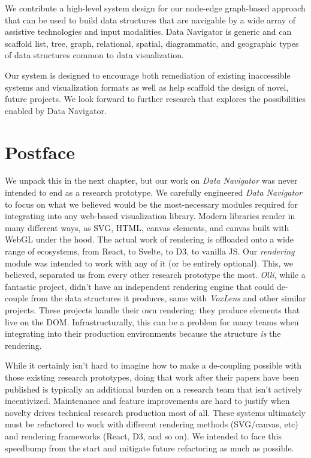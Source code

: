 \documentclass[12pt]{cmuthesis}
\begin{document}
We contribute a high-level system design for our node-edge graph-based approach that can be used to build data structures that are navigable by a wide array of assistive technologies and input modalities. Data Navigator is generic and can scaffold list, tree, graph, relational, spatial, diagrammatic, and geographic types of data structures common to data visualization.

Our system is designed to encourage both remediation of existing inaccessible systems and visualization formats as well as help scaffold the design of novel, future projects. We look forward to further research that explores the possibilities enabled by Data Navigator.

\newpage

\section{Postface}

We unpack this in the next chapter, but our work on \textit{Data Navigator} was never intended to end as a research prototype. We carefully engineered \textit{Data Navigator} to focus on what we believed would be the most-necessary modules required for integrating into any web-based visualization library. Modern libraries render in many different ways, as SVG, HTML, canvas elements, and canvas built with WebGL under the hood. The actual work of rendering is offloaded onto a wide range of ecosystems, from React, to Svelte, to D3, to vanilla JS. Our \textit{rendering} module was intended to work with any of it (or be entirely optional). This, we believed, separated us from every other research prototype the most. \textit{Olli}, while a fantastic project, didn't have an independent rendering engine that could de-couple from the data structures it produces, same with \textit{VoxLens} and other similar projects. These projects handle their own rendering: they produce elements that live on the DOM. Infrastructurally, this can be a problem for many teams when integrating into their production environments because the structure \textit{is} the rendering.

While it certainly isn't hard to imagine how to make a de-coupling possible with those existing research prototypes, doing that work after their papers have been published is typically an additional burden on a research team that isn't actively incentivized. Maintenance and feature improvements are hard to justify when novelty drives technical research production most of all. These systems ultimately must be refactored to work with different rendering methods (SVG/canvas, etc) and rendering frameworks (React, D3, and so on). We intended to face this speedbump from the start and mitigate future refactoring as much as possible.
\end{document}
